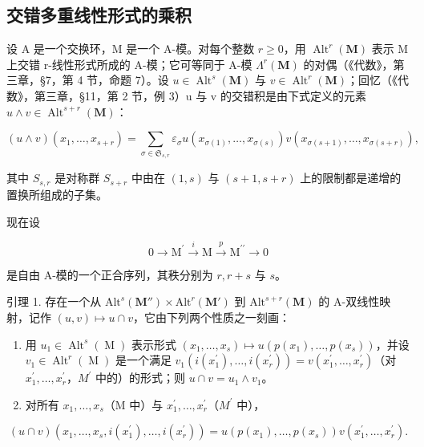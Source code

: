\subsection{交错多重线性形式的乘积}

设 A 是一个交换环，M 是一个 A-模。对每个整数 \(r \geq 0\)，用 \(\operatorname{Alt}^{r}(\mathbf{M})\) 表示 M 上交错 r-线性形式所成的 A-模；它可等同于 A-模 \(\Lambda^{r}(\mathbf{M})\) 的对偶（《代数》，第三章，§7，第 4 节，命题 7）。设 \(u \in \operatorname{Alt}^{s}(\mathbf{M})\) 与 \(v \in \operatorname{Alt}^{r}(\mathbf{M})\)；回忆（《代数》，第三章，§11，第 2 节，例 3）u 与 v 的交错积是由下式定义的元素 \(u \wedge v \in \operatorname{Alt}^{s+r}(\mathbf{M})\)：

\[
(u \wedge v) (x _ {1}, \dots , x _ {s + r}) = \sum_ {\sigma \in \mathfrak {S} _ {s, r}} \varepsilon_ {\sigma} u (x _ {\sigma (1)}, \dots , x _ {\sigma (s)}) v (x _ {\sigma (s + 1)}, \dots , x _ {\sigma (s + r)}),
\]

其中 \(S_{s,r}\) 是对称群 \(S_{s+r}\) 中由在 \((1,s)\) 与 \((s+1,s+r)\) 上的限制都是递增的置换所组成的子集。

现在设

\[
0 \longrightarrow \mathrm{M} ^ {\prime} \stackrel {i} {\longrightarrow} \mathrm{M} \stackrel {p} {\longrightarrow} \mathrm{M} ^ {\prime \prime} \longrightarrow 0
\]

是自由 A-模的一个正合序列，其秩分别为 \(r, r + s\) 与 \(s\)。

引理 1. 存在一个从 \(\mathrm{Alt}^s (\mathbf{M}'')\times \mathrm{Alt}^r (\mathbf{M}')\) 到 \(\mathrm{Alt}^{s + r}(\mathbf{M})\) 的 A-双线性映射，记作 \((u,v)\mapsto u\cap v\)，它由下列两个性质之一刻画：

\begin{enumerate}
\def\labelenumi{\alph{enumi})}
\item
  用 \(u_{1} \in \operatorname{Alt}^{s}(\operatorname{M})\) 表示形式 \((x_{1}, \ldots, x_{s}) \mapsto u(p(x_{1}), \ldots, p(x_{s}))\)，并设 \(v_{1} \in \operatorname{Alt}^{r}(\operatorname{M})\) 是一个满足 \(v_{1}(i(x_{1}^{\prime}), \ldots, i(x_{r}^{\prime})) = v(x_{1}^{\prime}, \ldots, x_{r}^{\prime})\)（对 \(x_{1}^{\prime}, \ldots, x_{r}^{\prime}\)，\(M^{\prime}\) 中的）的形式；则 \(u \cap v = u_{1} \wedge v_{1}\)。
\item
  对所有 \(x_{1},\ldots,x_{s}\)（M 中）与 \(x_{1}^{\prime},\ldots,x_{r}^{\prime}\)（\(M^{\prime}\) 中），
\end{enumerate}

\[
(u \cap v) (x _ {1}, \dots , x _ {s}, i (x _ {1} ^ {\prime}), \dots , i (x _ {r} ^ {\prime})) = u (p (x _ {1}), \dots , p (x _ {s})) v (x _ {1} ^ {\prime}, \dots , x _ {r} ^ {\prime}).\tag{1}
\]

